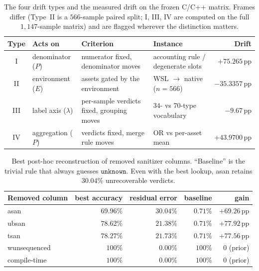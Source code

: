 \documentclass{article}
\newcommand{\unk}{\texttt{unknown}}
\newcommand{\pp}{\,\mathrm{pp}}
\begin{document}
\begin{table}[t]
\centering
\small
\caption{The four drift types and the measured drift on the frozen C/C++ matrix. Frames differ (Type~II is
a $566$-sample paired split; I, III, IV are computed on the full $1{,}147$-sample matrix) and are flagged
wherever the distinction matters.}
\label{tab:fourtypes}
\begin{tabular}{@{}c p{2.4cm} p{4.0cm} p{3.2cm} r@{}}
\toprule
Type & Acts on & Criterion & Instance & Drift \\
\midrule
I & denominator ($P$) & numerator fixed, denominator moves & accounting rule / degenerate slots & $+75.265\pp$ \\
II & environment ($E$) & assets gated by the environment & WSL $\to$ native ($n{=}566$) & $-35.3357\pp$ \\
III & label axis ($\lambda$) & per-sample verdicts fixed, grouping moves & $34$- vs $70$-type vocabulary & $-9.67\pp$ \\
IV & aggregation ($P$) & verdicts fixed, merge rule moves & OR vs per-asset mean & $+43.9700\pp$ \\
\bottomrule
\end{tabular}
\end{table}

\begin{table}[t]
\centering
\small
\caption{Best post-hoc reconstruction of removed sanitizer columns. ``Baseline'' is the trivial rule that
always guesses $\unk$. Even with the best lookup, asan retains $30.04\%$ unrecoverable verdicts.}
\label{tab:residual}
\begin{tabular}{@{}lrrrr@{}}
\toprule
Removed column & best accuracy & \textbf{residual error} & baseline & gain \\
\midrule
asan & $69.96\%$ & $\mathbf{30.04\%}$ & $0.71\%$ & $+69.26\pp$ \\
ubsan & $78.62\%$ & $\mathbf{21.38\%}$ & $0.71\%$ & $+77.92\pp$ \\
tsan & $78.27\%$ & $\mathbf{21.73\%}$ & $0.71\%$ & $+77.56\pp$ \\
wunsequenced & $100\%$ & $0.00\%$ & $100\%$ & $0$ (prior) \\
compile-time & $100\%$ & $0.00\%$ & $100\%$ & $0$ (prior) \\
\bottomrule
\end{tabular}
\end{table}
\end{document}
